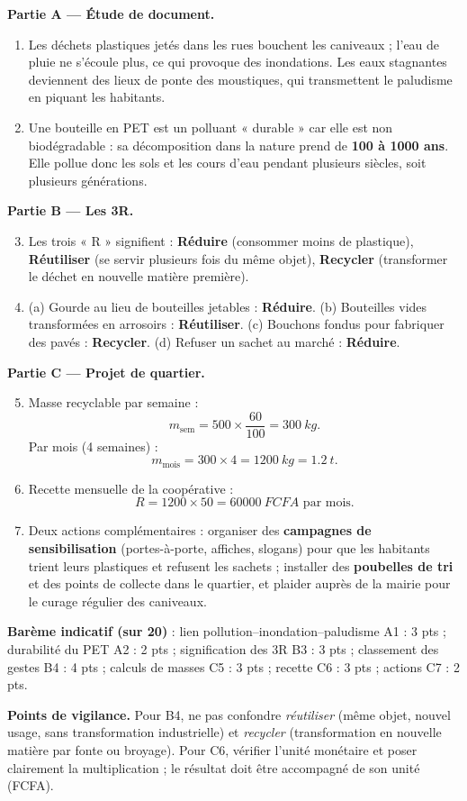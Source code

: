\documentclass[11pt]{article}
\begin{document}
\begin{corrige}
\textbf{Partie A — Étude de document.}
\begin{enumerate}
\item Les déchets plastiques jetés dans les rues bouchent les caniveaux ; l'eau de pluie ne s'écoule plus, ce qui provoque des inondations. Les eaux stagnantes deviennent des lieux de ponte des moustiques, qui transmettent le paludisme en piquant les habitants.
\item Une bouteille en PET est un polluant « durable » car elle est non biodégradable : sa décomposition dans la nature prend de \textbf{100 à \num{1000} ans}. Elle pollue donc les sols et les cours d'eau pendant plusieurs siècles, soit plusieurs générations.
\end{enumerate}
\textbf{Partie B — Les 3R.}
\begin{enumerate}
\setcounter{enumi}{2}
\item Les trois « R » signifient : \textbf{Réduire} (consommer moins de plastique), \textbf{Réutiliser} (se servir plusieurs fois du même objet), \textbf{Recycler} (transformer le déchet en nouvelle matière première).
\item (a) Gourde au lieu de bouteilles jetables : \textbf{Réduire}. (b) Bouteilles vides transformées en arrosoirs : \textbf{Réutiliser}. (c) Bouchons fondus pour fabriquer des pavés : \textbf{Recycler}. (d) Refuser un sachet au marché : \textbf{Réduire}.
\end{enumerate}
\textbf{Partie C — Projet de quartier.}
\begin{enumerate}
\setcounter{enumi}{4}
\item Masse recyclable par semaine :
\[ m_{\text{sem}} = 500 \times \frac{60}{100} = \SI{300}{kg}. \]
Par mois (4 semaines) :
\[ m_{\text{mois}} = 300 \times 4 = \SI{1200}{kg} = \SI{1,2}{t}. \]
\item Recette mensuelle de la coopérative :
\[ R = \num{1200} \times 50 = \SI{60000}{FCFA} \text{ par mois.} \]
\item Deux actions complémentaires : organiser des \textbf{campagnes de sensibilisation} (portes-à-porte, affiches, slogans) pour que les habitants trient leurs plastiques et refusent les sachets ; installer des \textbf{poubelles de tri} et des points de collecte dans le quartier, et plaider auprès de la mairie pour le curage régulier des caniveaux.
\end{enumerate}
\textbf{Barème indicatif (sur 20)} : lien pollution--inondation--paludisme A1 : 3 pts ; durabilité du PET A2 : 2 pts ; signification des 3R B3 : 3 pts ; classement des gestes B4 : 4 pts ; calculs de masses C5 : 3 pts ; recette C6 : 3 pts ; actions C7 : 2 pts.

\textbf{Points de vigilance.} Pour B4, ne pas confondre \emph{réutiliser} (même objet, nouvel usage, sans transformation industrielle) et \emph{recycler} (transformation en nouvelle matière par fonte ou broyage). Pour C6, vérifier l'unité monétaire et poser clairement la multiplication ; le résultat doit être accompagné de son unité (FCFA).
\end{corrige}
\end{document}
